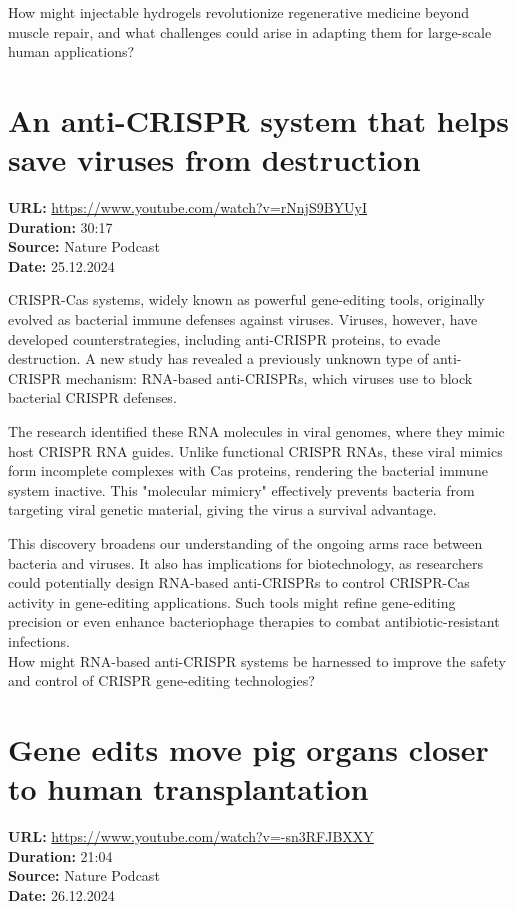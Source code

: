 \documentclass[12pt]{article}
\begin{document}
How might injectable hydrogels revolutionize regenerative medicine beyond muscle repair, and what challenges could arise in adapting them for large-scale human applications?  




\newpage

\section{An anti-CRISPR system that helps save viruses from destruction}
\textbf{URL:} \url{https://www.youtube.com/watch?v=rNnjS9BYUyI}\\
\textbf{Duration:} 30:17\\
\textbf{Source:} Nature Podcast\\
\textbf{Date:} 25.12.2024



CRISPR-Cas systems, widely known as powerful gene-editing tools, originally evolved as bacterial immune defenses against viruses. Viruses, however, have developed counterstrategies, including anti-CRISPR proteins, to evade destruction. A new study has revealed a previously unknown type of anti-CRISPR mechanism: RNA-based anti-CRISPRs, which viruses use to block bacterial CRISPR defenses.  

The research identified these RNA molecules in viral genomes, where they mimic host CRISPR RNA guides. Unlike functional CRISPR RNAs, these viral mimics form incomplete complexes with Cas proteins, rendering the bacterial immune system inactive. This "molecular mimicry" effectively prevents bacteria from targeting viral genetic material, giving the virus a survival advantage.  

This discovery broadens our understanding of the ongoing arms race between bacteria and viruses. It also has implications for biotechnology, as researchers could potentially design RNA-based anti-CRISPRs to control CRISPR-Cas activity in gene-editing applications. Such tools might refine gene-editing precision or even enhance bacteriophage therapies to combat antibiotic-resistant infections.\\[5px]  

 
How might RNA-based anti-CRISPR systems be harnessed to improve the safety and control of CRISPR gene-editing technologies?  




\newpage

\section{Gene edits move pig organs closer to human transplantation}
\textbf{URL:} \url{https://www.youtube.com/watch?v=-sn3RFJBXXY}\\
\textbf{Duration:} 21:04\\
\textbf{Source:} Nature Podcast\\
\textbf{Date:} 26.12.2024
\end{document}
